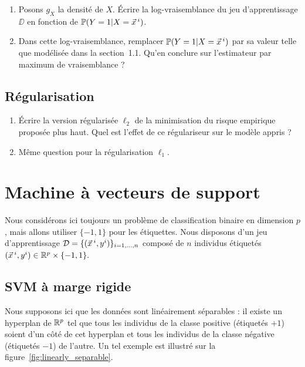 \documentclass[french,11pt]{article}
\begin{document}
\begin{enumerate}
\item 
  Posons $g_X$ la densité de $X$. Écrire la log-vraisemblance du jeu
  d'apprentissage $\DD$ en fonction de $\PP(Y=1 | X=\xx^i)$.
\item Dans cette log-vraisemblance, remplacer $\PP(Y=1 | X=\xx^i)$ par sa
  valeur telle que modélisée dans la section~1.1. Qu'en conclure sur
  l'estimateur par maximum de vraisemblance ?
\end{enumerate}


\subsection{Régularisation}

\begin{enumerate}
\item Écrire la version régularisée $\ell_2$ de la minimisation du risque
  empirique proposée plus haut. %
  Quel est l'effet de ce
  régulariseur sur le modèle appris ?
\item Même question pour la régularisation $\ell_1$.
\end{enumerate}


\section{Machine à vecteurs de support}
Nous considérons ici toujours un problème de classification binaire en
dimension $p$, mais allons utiliser $\{-1, 1\}$ pour les étiquettes. Nous
disposons d'un jeu d'apprentissage $\DD = \{(\xx^i, y^i)\}_{i=1, \dots, n}$
composé de $n$ individus étiquetés
$(\xx^i, y^i) \in \RR^{p} \times \{-1, 1\}.$


\subsection{SVM à marge rigide}
Nous supposons ici que les données sont linéairement séparables : il existe un
hyperplan de $\mathbb{R}^p$ tel que tous les individus de la classe positive
(étiquetés $+1$) soient d'un côté de cet hyperplan et tous les individus de la
classe négative (étiquetés $-1$) de l'autre. Un tel exemple est illustré sur la figure~\ref{fig:linearly_separable}.
\end{document}
